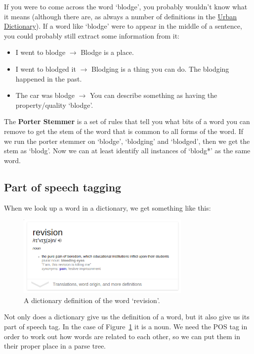If you were to come across the word `blodge', you probably wouldn't know what it
means (although there are, as always a number of definitions in the
\href{http://www.urbandictionary.com/define.php?term=blodge}{Urban Dictionary}).
If a word like `blodge' were to appear in the middle of a sentence, you could
probably still extract some information from it:

\begin{itemize}
  \item I went to blodge $\rightarrow$ Blodge is a place.
  \item I went to blodged it $\rightarrow$ Blodging is a thing you can do.
    The blodging happened in the past.
  \item The car was blodge $\rightarrow$ You can describe something as having 
    the property/quality `blodge'.
\end{itemize}

The \textbf{Porter Stemmer} is a set of rules that tell you what bits of a word
you can remove to get the stem of the word that is common to all forms of the
word. If we run the porter stemmer on `blodge', `blodging' and `blodged', then
we get the stem as `blodg'. Now we can at least identify all instances of
`blodg*' as the same word.

\subsection{Part of speech tagging}

When we look up a word in a dictionary, we get something like this:

\begin{figure}[H]
  \centering
  \includegraphics[width=0.75\textwidth]{images/revision-definition}
  \caption{A dictionary definition of the word `revision'.}
  \label{fig:revision-definition}
\end{figure}

Not only does a dictionary give us the definition of a word, but it also give us
its part of speech tag. In the case of Figure~\ref{fig:revision-definition} it
is a noun. We need the POS tag in order to work out how words are related to
each other, so we can put them in their proper place in a parse tree.

